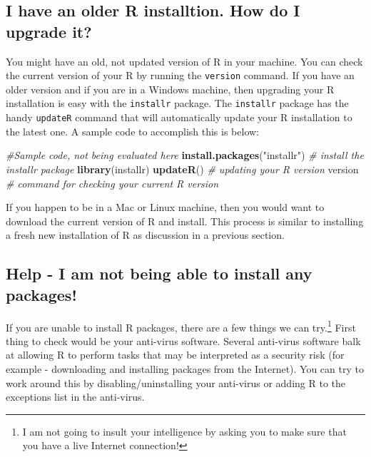 \documentclass[]{krantz}
\makeatletter
\newenvironment{Shaded}{\begin{snugshade}}{\end{snugshade}}
\newcommand{\KeywordTok}[1]{\textcolor[rgb]{0.27,0.27,0.27}{\textbf{#1}}}
\newcommand{\StringTok}[1]{\textcolor[rgb]{0.5,0.5,0.5}{#1}}
\newcommand{\CommentTok}[1]{\textcolor[rgb]{0.56,0.35,0.01}{\textit{#1}}}
\newcommand{\NormalTok}[1]{#1}
\newenvironment{kframe}{%
\medskip{}
\setlength{\fboxsep}{.8em}
 \def\at@end@of@kframe{}%
 \ifinner\ifhmode%
  \def\at@end@of@kframe{\end{minipage}}%
  \begin{minipage}{\columnwidth}%
 \fi\fi%
 \def\FrameCommand##1{\hskip\@totalleftmargin \hskip-\fboxsep
 \colorbox{shadecolor}{##1}\hskip-\fboxsep
     \hskip-\linewidth \hskip-\@totalleftmargin \hskip\columnwidth}%
 \MakeFramed {\advance\hsize-\width
   \@totalleftmargin\z@ \linewidth\hsize
   \@setminipage}}%
 {\par\unskip\endMakeFramed%
 \at@end@of@kframe}
\renewenvironment{Shaded}{\begin{kframe}}{\end{kframe}}
\theoremstyle{definition}
\theoremstyle{definition}
\theoremstyle{definition}
\theoremstyle{remark}
\makeatother
\begin{document}
\subsection{I have an older R installtion. How do I upgrade
it?}\label{i-have-an-older-r-installtion.-how-do-i-upgrade-it}

You might have an old, not updated version of R in your machine. You can
check the current version of your R by running the \texttt{version}
command. If you have an older version and if you are in a Windows
machine, then upgrading your R installation is easy with the
\texttt{installr} package. The \texttt{installr} package has the handy
\texttt{updateR} command that will automatically update your R
installation to the latest one. A sample code to accomplish this is
below:

\begin{Shaded}
\begin{Highlighting}[]
\CommentTok{#Sample code, not being evaluated here}
\KeywordTok{install.packages}\NormalTok{(}\StringTok{"installr"}\NormalTok{) }\CommentTok{# install the installr package }
\KeywordTok{library}\NormalTok{(installr)}
\KeywordTok{updateR}\NormalTok{() }\CommentTok{# updating your R version}
\NormalTok{version }\CommentTok{# command for checking your current R version}
\end{Highlighting}
\end{Shaded}

If you happen to be in a Mac or Linux machine, then you would want to
download the current version of R and install. This process is similar
to installing a fresh new installation of R as discussion in a previous
section.

\subsection{Help - I am not being able to install any
packages!}\label{help---i-am-not-being-able-to-install-any-packages}

If you are unable to install R packages, there are a few things we can
try.\footnote{I am not going to insult your intelligence by asking you
  to make sure that you have a live Internet connection!} First thing to
check would be your anti-virus software. Several anti-virus software
balk at allowing R to perform tasks that may be interpreted as a
security risk (for example - downloading and installing packages from
the Internet). You can try to work around this by disabling/uninstalling
your anti-virus or adding R to the exceptions list in the anti-virus.
\end{document}
